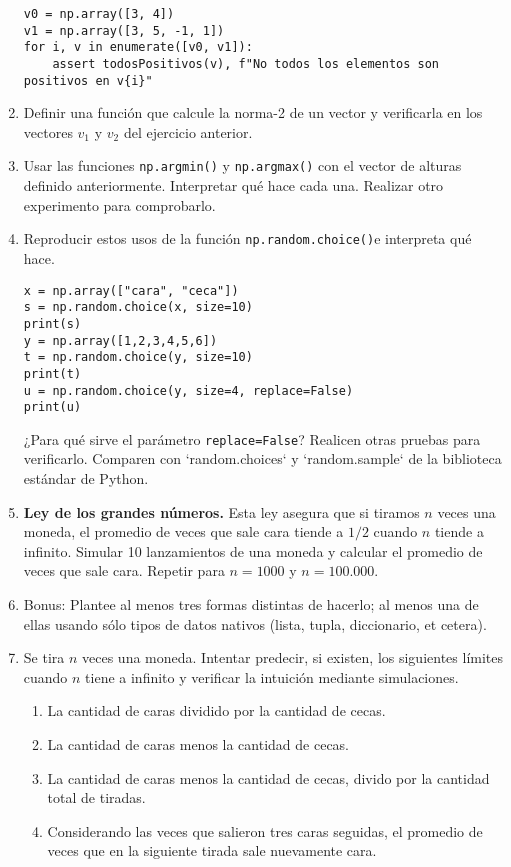 \documentclass[a4paper,11pt]{article}
\theoremstyle{definition}
\begin{document}
\begin{enumerate}[resume]
\begin{lstlisting}
v0 = np.array([3, 4])
v1 = np.array([3, 5, -1, 1])
for i, v in enumerate([v0, v1]):
    assert todosPositivos(v), f"No todos los elementos son positivos en v{i}"
\end{lstlisting}

\item Definir una función que calcule la norma-2 de un vector y verificarla en los vectores $v_1$ y $v_2$ del ejercicio anterior.

\item Usar las funciones \lstinline{np.argmin()} y \lstinline{np.argmax()} con el vector de alturas definido anteriormente. Interpretar qué hace cada una. Realizar otro experimento para comprobarlo.

\item Reproducir estos usos de la función \lstinline{np.random.choice()}e interpreta qué hace.
\begin{lstlisting}
x = np.array(["cara", "ceca"])
s = np.random.choice(x, size=10)
print(s)
y = np.array([1,2,3,4,5,6])
t = np.random.choice(y, size=10)
print(t)
u = np.random.choice(y, size=4, replace=False)
print(u)
\end{lstlisting}

¿Para qué sirve el parámetro \lstinline{replace=False}? Realicen otras pruebas para verificarlo. Comparen con `random.choices` y `random.sample` de la biblioteca estándar de Python.

\item {\textbf{Ley de los grandes números.}} Esta ley asegura que si tiramos $n$ veces una moneda, el promedio de veces que sale cara tiende a $1/2$ cuando $n$ tiende a infinito.
Simular 10 lanzamientos de una moneda y calcular el promedio de veces que sale cara. Repetir para $n = 1000$ y $n = 100.000$.

\item Bonus: Plantee al menos tres formas distintas de hacerlo; al menos una de ellas usando sólo tipos de datos nativos (lista, tupla, diccionario, et cetera).

\item Se tira $n$ veces una moneda. Intentar predecir, si existen, los siguientes límites cuando $n$ tiene a infinito y verificar la intuición mediante simulaciones.

\begin{enumerate}
\item La cantidad de caras dividido por la cantidad de cecas.
\item La cantidad de caras menos la cantidad de cecas.
\item La cantidad de caras menos la cantidad de cecas, divido por la cantidad total de tiradas.
\item Considerando las veces que salieron tres caras seguidas, el promedio de veces que en la siguiente tirada sale nuevamente cara.
\end{enumerate}



\end{enumerate}
\end{document}
